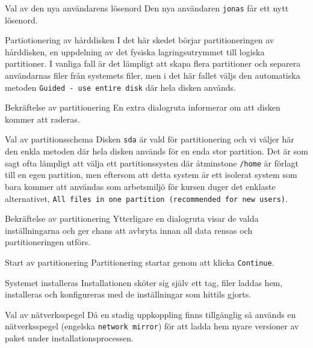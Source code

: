            {Val av den nya användarens lösenord}
           {Den nya användaren \texttt{jonas} får ett nytt lösenord.}
           {}

           {Partiotionering av hårddisken}
           {I det här skedet börjar partitioneringen av hårddisken, en
            uppdelning av det fysiska lagringsutrymmet till logiska
            partitioner. I vanliga fall är det lämpligt att skapa flera
            partitioner och separera användarnas filer från systemets filer,
            men i det här fallet väljs den automatiska metoden
            \texttt{Guided - use entire disk} där hela disken används.}
           {}

           {Bekräftelse av partitionering}
           {En extra dialogruta informerar om att disken kommer att raderas.}
           {}

           {Val av partitionsschema}
           {Disken \texttt{sda} är vald för partitionering och vi väljer här
            den enkla metoden där hela disken används för en enda stor partition.
            Det är som sagt ofta lämpligt att välja ett partitionssysten där
            åtminstone \texttt{/home} är förlagt till en egen partition, men
            eftersom att detta system är ett isolerat system som bara kommer
            att användas som arbetsmiljö för kursen duger det enklaste alternativet,
            \texttt{All files in one partition (recommended for new users)}.
            }
           {}

           {Bekräftelse av partitionering}
           {Ytterligare en dialogruta visar de valda inställningarna och ger
            chans att avbryta innan all data rensas och partitioneringen utförs.}
           {}

           {Start av partitionering}
           {Partitionering startar genom att klicka \texttt{Continue}.}
           {}

           {Systemet installeras}
           {Installationen sköter sig själv ett tag, filer laddas hem, installeras
            och konfigureras med de inställningar som hittils gjorts.}
           {}

           {Val av nätverksspegel}
           {Då en stadig uppkoppling finns tillgänglig så används en
           nätverksspegel (engelska \texttt{network mirror}) för att ladda hem
           nyare versioner av paket under installationsprocessen.}
           {}

